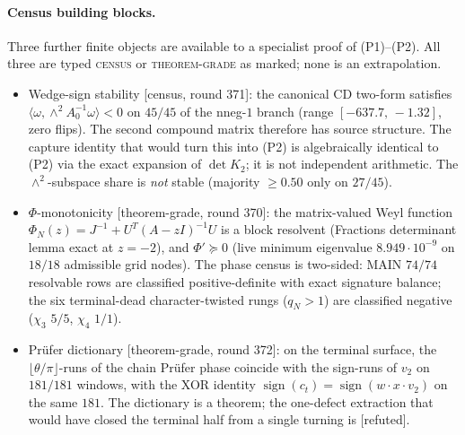 \documentclass[11pt]{article}
\theoremstyle{remark}
\newcommand{\gr}[1]{\textnormal{\small[#1]}}
\begin{document}
\paragraph{Census building blocks.}
Three further finite objects are available to a specialist proof of
(P1)--(P2).  All three are typed \textsc{census} or
\textsc{theorem-grade} as marked; none is an extrapolation.
\begin{itemize}
\item
Wedge-sign stability \gr{census, round 371}: the canonical CD
two-form satisfies
$\langle\omega,\wedge^{2}A_{0}^{-1}\omega\rangle<0$ on $45/45$ of
the nneg-$1$ branch (range $[-637.7,\,-1.32]$, zero flips).  The
second compound matrix therefore has source structure.  The
capture identity that would turn this into (P2) is algebraically
identical to (P2) via the exact expansion of $\det K_{2}$; it is
not independent arithmetic.  The $\wedge^{2}$-subspace share is
\emph{not} stable (majority $\ge0.50$ only on $27/45$).
\item
$\Phi$-monotonicity \gr{theorem-grade, round 370}: the
matrix-valued Weyl function
$\Phi_{N}(z)=J^{-1}+U^{T}(A-zI)^{-1}U$ is a block resolvent
(Fractions determinant lemma exact at $z=-2$), and
$\Phi'\succeq0$ (live minimum eigenvalue $8.949\cdot10^{-9}$ on
$18/18$ admissible grid nodes).  The phase census is two-sided:
MAIN $74/74$ resolvable rows are classified positive-definite with
exact signature balance; the six terminal-dead character-twisted
rungs ($q_{N}>1$) are classified negative ($\chi_{3}$ $5/5$,
$\chi_{4}$ $1/1$).
\item
Pr\"ufer dictionary \gr{theorem-grade, round 372}: on the terminal
surface, the $\lfloor\theta/\pi\rfloor$-runs of the chain Pr\"ufer
phase coincide with the sign-runs of $v_{2}$ on $181/181$ windows,
with the XOR identity $\operatorname{sign}(c_{t})=\operatorname{sign}(w\cdot x\cdot v_{2})$
on the same $181$.  The dictionary is a theorem; the one-defect
extraction that would have closed the terminal half from a single
turning is \gr{refuted}.
\end{itemize}
\end{document}
